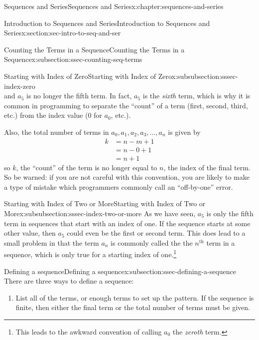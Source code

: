 \documentclass[twoside,10pt,]{book}
\numberwithin{equation}{section}
\newcommand{\nth}{{n^{\text{th}}}}
\newcommand{\amp}{&}
\begin{document}
\begin{chapterptx}{Sequences and Series}{}{Sequences and Series}{}{}{x:chapter:sequences-and-series}
\begin{sectionptx}{Introduction to Sequences and Series}{}{Introduction to Sequences and Series}{}{}{x:section:sec-intro-to-seq-and-ser}
\begin{subsectionptx}{Counting the Terms in a Sequence}{}{Counting the Terms in a Sequence}{}{}{x:subsection:ssec-counting-seq-terms}
\begin{subsubsectionptx}{Starting with Index of Zero}{}{Starting with Index of Zero}{}{}{x:subsubsection:sssec-index-zero}
\begin{equation*}
\end{equation*}
and \(a_5\) is no longer the fifth term.  In fact, \(a_5\) is the \emph{sixth} term, which is why it is common in programming to separate the ``count'' of a term (first, second, third, etc.) from the index value (0 for \(a_0\), etc.).%
\par
Also, the total number of terms in \(a_0, a_1, a_2, a_3, \ldots, a_n\) is given by%
\begin{align*}
k \amp = n - m + 1\\
\amp = n - 0 + 1\\
\amp =n+1
\end{align*}
so \(k\), the ``count'' of the term is no longer equal to \(n\), the index of the final term.  So be warned:  if you are not careful with this convention, you are likely to make a type of mistake which programmers commonly call an ``off-by-one'' error.%
\end{subsubsectionptx}
%
%
\typeout{************************************************}
\typeout{************************************************}
%
\begin{subsubsectionptx}{Starting with Index of Two or More}{}{Starting with Index of Two or More}{}{}{x:subsubsection:sssec-index-two-or-more}
As we have seen, \(a_5\) is only the fifth term in sequences that start with an index of one.  If the sequence starts at some other value, then \(a_5\) could even be the first or second term.  This does lead to a small problem in that the term \(a_n\) is commonly called the the \(\nth{}\) term in a sequence, which is only true for a starting index of one.\footnote{This leads to the awkward convention of calling \(a_0\) the \emph{zeroth} term.\label{g:fn:idp29602904}}%
\end{subsubsectionptx}
\end{subsectionptx}
%
%
\typeout{************************************************}
\typeout{************************************************}
%
\begin{subsectionptx}{Defining a sequence}{}{Defining a sequence}{}{}{x:subsection:ssec-defining-a-sequence}
There are three ways to define a sequence: %
\begin{enumerate}[label=(\alph*)]
\item{}List all of the terms, or enough terms to set up the pattern.  If the sequence is finite, then either the final term or the total number of terms must be given.%

\end{enumerate}
\end{subsectionptx}
\end{sectionptx}
\end{chapterptx}
\end{document}
